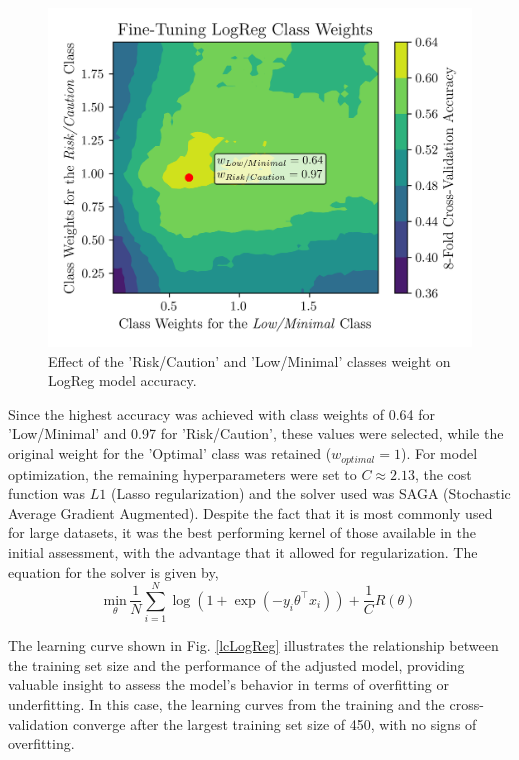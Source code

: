 \documentclass[conference]{IEEEtran}
\begin{document}
\begin{figure}[H]
    \centering
    \includegraphics[width=.9\linewidth]{assets/LOGR_class_weights.png}
    \caption{Effect of the 'Risk/Caution' and 'Low/Minimal' classes weight on LogReg model accuracy.}
    \label{logregWt}
\end{figure} %

Since the highest accuracy was achieved with class weights of 0.64 for 'Low/Minimal' and 0.97 for 'Risk/Caution', these values were selected, while the original weight for the 'Optimal' class was retained ($w_{optimal} = 1$). For model optimization, the remaining hyperparameters were set to $C \approx 2.13$, the cost function was $L1$ (Lasso regularization) and the solver used was SAGA (Stochastic Average Gradient Augmented). Despite the fact that it is most commonly used for large datasets, it was the best performing kernel of those available in the initial assessment, with the advantage that it allowed for regularization. The equation for the solver is given by,
\begin{equation*}
\underset{\theta}{\text{min}} \, \frac{1}{N} \sum_{i=1}^{N} \log\left(1 + \exp\left(-y_i \theta^\top x_i\right)\right) + \frac{1}{C} R(\theta)
\end{equation*} %

The learning curve shown in Fig. \ref{lcLogReg} illustrates the relationship between the training set size and the performance of the adjusted model, providing valuable insight to assess the model's behavior in terms of overfitting or underfitting. In this case, the learning curves from the training and the cross-validation converge after the largest training set size of 450, with no signs of overfitting.
\end{document}
